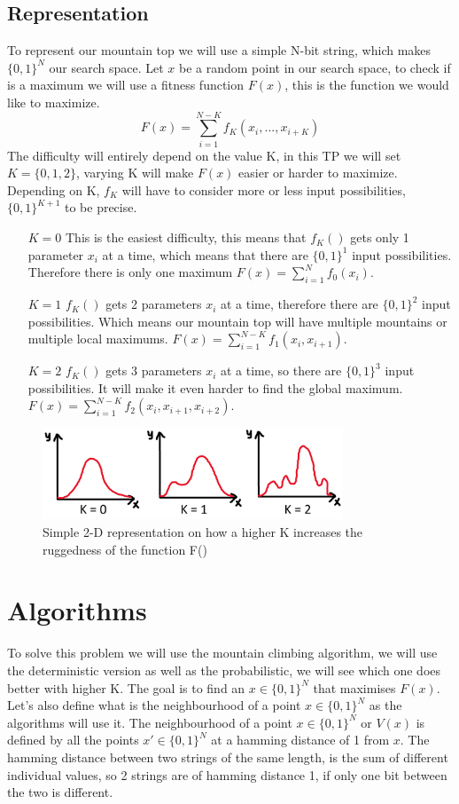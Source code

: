 \documentclass[a4paper]{article}
\begin{document}
\subsection{Representation}
To represent our mountain top we will use a simple N-bit string, which makes $\{0,1\}^{N}$ our search space. Let $x$ be a random point in our search space, to check if is a maximum we will use a fitness function $F(x)$, this is the function we would like to maximize.
$$F(x) = \sum^{N-K}_{i = 1} f_{K}(x_{i}, ..., x_{i+K})$$
The difficulty will entirely depend on the value K, in this TP we will set $K = \{0,1,2\}$, varying K will make $F(x)$ easier or harder to maximize. Depending on K, $f_{K}$ will have to consider more or less input possibilities, $\{0,1\}^{K+1}$ to be precise.\\
\begin{itemize}
\item [$K=0$] This is the easiest difficulty, this means that $f_{K}()$ gets only 1 parameter $x_{i}$ at a time, which means that there are $\{0,1\}^{1}$ input possibilities. Therefore there is only one maximum $F(x) = \sum^{N}_{i = 1} f_{0}(x_{i})$.
\item [$K=1$] $f_{K}()$ gets 2 parameters $x_{i}$ at a time, therefore there are $\{0,1\}^{2}$ input possibilities. Which means our mountain top will have multiple mountains or multiple local maximums. $F(x) = \sum^{N-K}_{i = 1} f_{1}(x_{i}, x_{i+1})$.
\item [$K=2$] $f_{K}()$ gets 3 parameters $x_{i}$ at a time, so there are $\{0,1\}^{3}$ input possibilities. It will make it even harder to find the global maximum. $F(x) = \sum^{N-K}_{i = 1} f_{2}(x_{i}, x_{i+1}, x_{i+2})$.
\end{itemize}
\begin{figure}[H]
\center
\includegraphics[width=0.8\textwidth]{images/simple_representation.PNG}
\caption{Simple 2-D representation on how a higher K increases the ruggedness of the function F()}
\end{figure}
\section{Algorithms}
To solve this problem we will use the mountain climbing algorithm, we will use the deterministic version as well as the probabilistic, we will see which one does better with higher K. The goal is to find an $x \in \{0,1\}^{N}$ that maximises $F(x)$.\\
Let's also define what is the neighbourhood of a point $x \in \{0,1\}^{N}$ as the algorithms will use it. The neighbourhood of a point $x \in \{0,1\}^{N}$ or $V(x)$ is defined by all the points $x' \in \{0,1\}^{N}$ at a hamming distance of 1 from $x$. The hamming distance between two strings of the same length, is the sum of different individual values, so 2 strings are of hamming distance 1, if only one bit between the two is different.
\end{document}
